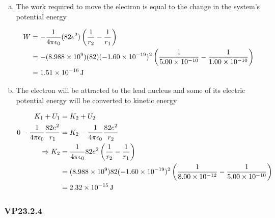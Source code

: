 \documentclass{article}
\begin{document}
\begin{enumerate}[a)]
  \item The work required to move the electron is equal to the change in the system's potential energy

        \begin{align*}
          W & = -\frac{1}{4 \pi \epsilon_0} (82 e^2) \left( \frac{1}{r_2} - \frac{1}{r_1} \right)                                                   \\
            & = -(\num{8.988e9}) (82) (\num{-1.60e-19})^2 \left( \frac{1}{\num{5.00e-10}} - \frac{1}{\num{1.00e-10}} \right) \\
            & = \qty{1.51e-16}{J}
        \end{align*}

  \item The electron will be attracted to the lead nucleus and some of its electric potential energy will be converted to kinetic energy

        \begin{align*}
          K_1 + U_1                  & = K_2 + U_2                                                                                               \\
          0 - \frac{1}{4 \pi \epsilon_0} \frac{82 e^2}{r_1} & = K_2 - \frac{1}{4 \pi \epsilon_0} \frac{82 e^2}{r_2}                                                                            \\
          \Rightarrow K_2            & = \frac{1}{4 \pi \epsilon_0} 82 e^2 \left( \frac{1}{r_2} - \frac{1}{r_1} \right)                                                 \\
                                     & = (\num{8.988e9})82(\num{-1.60e-19})^2 \left( \frac{1}{\num{8.00e-12}} - \frac{1}{\num{5.00e-10}} \right) \\
                                     & = \qty{2.32e-15}{J}
        \end{align*}
\end{enumerate}

\subsubsection{VP23.2.4}
\end{document}
